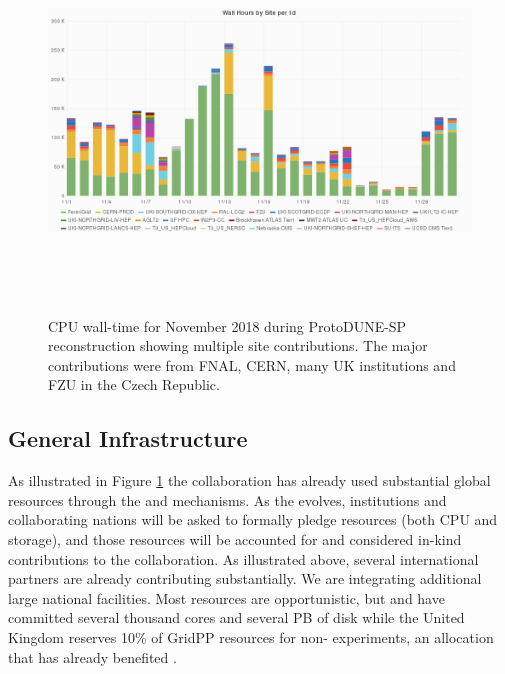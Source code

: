 \begin{figure}[htp]
\centering
\includegraphics[height=4in]{graphics/comp-vo-summary.png}

\caption{CPU wall-time for November 2018 during ProtoDUNE-SP reconstruction showing multiple site contributions.  The major contributions were from FNAL, CERN, many UK institutions and FZU in the Czech Republic.}
\label{fig:ch-exec-comp-cpupie}
\end{figure}


\subsection{General Infrastructure}
As illustrated in Figure \ref{fig:ch-exec-comp-cpupie} the collaboration has already used substantial global resources through the  and  mechanisms. As the  evolves, institutions and collaborating nations will be asked to formally pledge resources (both CPU and storage), and those resources will be accounted for and considered in-kind contributions to the collaboration.
As illustrated above, several international partners are already contributing substantially. We are integrating additional large national facilities. Most resources are opportunistic, but  and  have committed several thousand cores and several PB of disk while the United Kingdom reserves 10\% of GridPP resources for non- experiments, an allocation that has already benefited .


